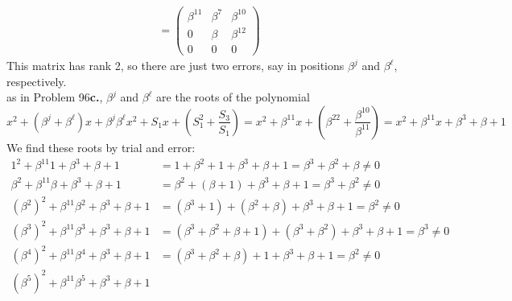 \documentclass[11pt]{article}
\newcommand{\vc}[1]{\begin{pmatrix}#1\end{pmatrix}}
\begin{document}
\begin{itemize}
\begin{align*}
                               = \vc{\beta^{11}  & \beta^7                      & \beta^{10}\\
                                     0           & \beta                        & \beta^{12} \\
                                     0           & 0                            & 0}
                  \end{align*}
                  This matrix has rank 2, so there are just two errors,
                  say in positions $\beta^j$ and $\beta^\ell$, respectively.\\
                  as in Problem 96{\bf c.},
                  $\beta^j$ and $\beta^\ell$ are the roots of the polynomial
                  \[
                     x^2 + (\beta^j+\beta^\ell)x + \beta^j\beta^\ell
                     x^2 + S_1x + (S_1^2 + \frac{S_3}{S_1})
                   = x^2 + \beta^{11}x + (\beta^{22}+\frac{\beta^{10}}{\beta^{11}})
                   = x^2 + \beta^{11}x + \beta^3 + \beta + 1
                   \]
                   We find these roots by trial and error:
                   \begin{align*}
                        1^2 + \beta^{11}1 + \beta^3 + \beta + 1
                     &= 1   + \beta^2 + 1 + \beta^3 + \beta + 1
                      = \beta^3 + \beta^2 + \beta
                      \neq 0\\
                        \beta^2 + \beta^{11} \beta  + \beta^3 + \beta + 1
                     &= \beta^2 + (\beta + 1)       + \beta^3 + \beta + 1
                      = \beta^3 + \beta^2
                      \neq 0\\
                        (\beta^2)^2 + \beta^{11}\beta^2 + \beta^3 + \beta + 1
                     &= (\beta^3 + 1) + (\beta^2+\beta) + \beta^3 + \beta + 1
                      =  \beta^2
                      \neq 0\\
                        (\beta^3)^2 + \beta^{11}\beta^3   + \beta^3 + \beta + 1
                     &= (\beta^3 + \beta^2 + \beta + 1)   + (\beta^3+\beta^2) + \beta^3 + \beta + 1
                      =  \beta^3
                      \neq 0\\
                        (\beta^4)^2 + \beta^{11}\beta^4   + \beta^3 + \beta + 1
                     &= (\beta^3 + \beta^2 + \beta)   + 1 + \beta^3 + \beta + 1
                      =  \beta^2
                      \neq 0\\
                        (\beta^5)^2 + \beta^{11}\beta^5   + \beta^3 + \beta + 1

\end{align*}
\end{itemize}
\end{document}
